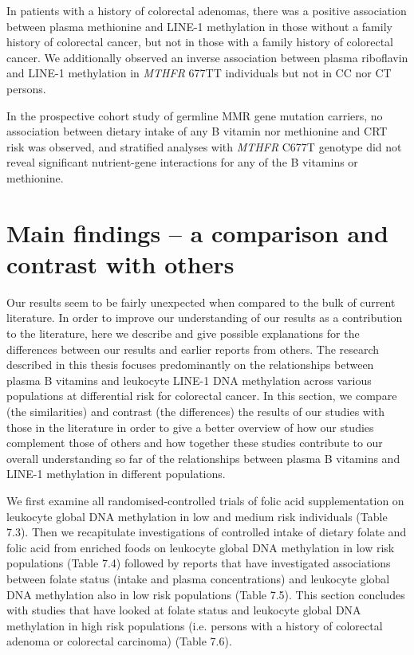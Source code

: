 \noindent In patients with a history of colorectal adenomas, there was a positive association between plasma methionine and LINE-1 methylation in those without a family history of colorectal cancer, but not in those with a family history of colorectal cancer. We additionally observed an inverse association between plasma riboflavin and LINE-1 methylation in \emph{MTHFR} 677TT individuals but not in CC nor CT persons. 
 
\noindent In the prospective cohort study of germline MMR gene mutation carriers, no association between dietary intake of any B vitamin nor methionine and CRT risk was observed, and stratified analyses with \emph{MTHFR} C677T genotype did not reveal significant nutrient-gene interactions for any of the B vitamins or methionine. 
 
\section[]{Main findings -- a comparison and contrast with others} %
Our results seem to be fairly unexpected when compared to the bulk of current literature. In order to improve our understanding of our results as a contribution to the literature, here we describe and give possible explanations for the differences between our results and earlier reports from others. The research described in this thesis focuses predominantly on the relationships between plasma B vitamins and leukocyte LINE-1 DNA methylation across various populations at differential risk for colorectal cancer. In this section, we compare (the similarities) and contrast (the differences) the results of our studies with those in the literature in order to give a better overview of how our studies complement those of others and how together these studies contribute to our overall understanding so far of the relationships between plasma B vitamins and LINE-1 methylation in different populations. 
 
\noindent We first examine all randomised-controlled trials of folic acid supplementation on leukocyte global DNA methylation in low and medium risk individuals (Table 7.3). Then we recapitulate investigations of controlled intake of dietary folate and folic acid from enriched foods on leukocyte global DNA methylation in low risk populations (Table 7.4) followed by reports that have investigated associations between folate status (intake and plasma concentrations) and leukocyte global DNA methylation also in low risk populations (Table 7.5). This section concludes with studies that have looked at folate status and leukocyte global DNA methylation in high risk populations (i.e. persons with a history of colorectal adenoma or colorectal carcinoma) (Table 7.6). 
 
